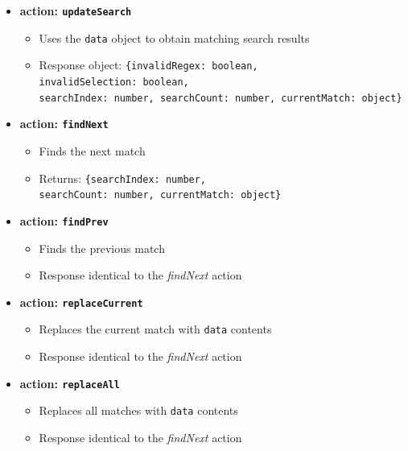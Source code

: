 \documentclass[bsc,frontabs,twoside,singlespacing,parskip,deptreport]{infthesis}
\providecommand{\tightlist}{%
  \setlength{\itemsep}{0pt}\setlength{\parskip}{0pt}}
\begin{document}
\begin{itemize}
\tightlist

\item\textbf{action: \texttt{updateSearch}}

\begin{itemize}
\tightlist
\item
  Uses the \texttt{data} object to obtain matching search results
\item
  Response object:
  \texttt{\{invalidRegex:\ boolean, invalidSelection:\ boolean,\\ searchIndex:\ number, searchCount:\ number, currentMatch:\ object\}}
\end{itemize}

\item\textbf{action: \texttt{findNext}}

\begin{itemize}
\tightlist
\item
  Finds the next match
\item
  Returns:
  \texttt{\{searchIndex:\ number, searchCount:\ number,\ currentMatch:\ object\}}
\end{itemize}

\item\textbf{action: \texttt{findPrev}}

\begin{itemize}
\tightlist
\item
  Finds the previous match
\item
  Response identical to the \textit{findNext} action
\end{itemize}

\item\textbf{action: \texttt{replaceCurrent}}

\begin{itemize}
\tightlist
\item
  Replaces the current match with \texttt{data} contents
\item
  Response identical to the \textit{findNext} action
\end{itemize}

\item\textbf{action: \texttt{replaceAll}}

\begin{itemize}
\tightlist
\item
  Replaces all matches with \texttt{data} contents
\item
  Response identical to the \textit{findNext} action
\end{itemize}


\end{itemize}
\end{document}
